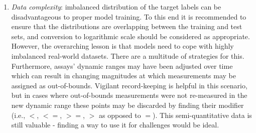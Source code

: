 \documentclass[journal=jcim,manuscript=article]{achemso}
\begin{document}
{\begin{enumerate}
    \item \textit{Data complexity}: imbalanced distribution of the target labels can be disadvantageous to proper model training. To this end it is recommended to ensure that the distributions are overlapping between the training and test sets, and conversion to logarithmic scale should be considered as appropriate. However, the overarching lesson is that models need to cope with highly imbalanced real-world datasets. There are a multitude of strategies for this. Furthermore, assays' dynamic ranges may have been adjusted over time which can result in changing magnitudes at which measurements may be assigned as out-of-bounds. Vigilant record-keeping is helpful in this scenario, but in cases where out-of-bounds measurements were not re-measured in the new dynamic range these points may be discarded by finding their modifier (i.e., $<$, $<=$, $>=$, $>$ as opposed to $=$). This semi-quantitative data is still valuable - finding a way to use it for challenges would be ideal.
\end{enumerate}

}
\end{document}
